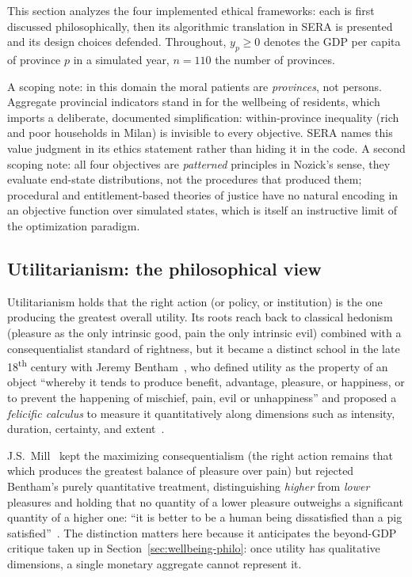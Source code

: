 \documentclass[11pt,a4paper]{article}
\begin{document}
This section analyzes the four implemented ethical frameworks: each is first
discussed philosophically, then its algorithmic translation in SERA is
presented and its design choices defended. Throughout, $y_p \geq 0$ denotes the
GDP per capita of province $p$ in a simulated year, $n = 110$ the number of
provinces.

A scoping note: in this domain the moral patients are \emph{provinces}, not
persons. Aggregate provincial indicators stand in for the wellbeing of
residents, which imports a deliberate, documented simplification:
within-province inequality (rich and poor households in Milan) is invisible to
every objective. SERA names this value judgment in its ethics statement rather
than hiding it in the code. A second scoping note: all four objectives are
\emph{patterned} principles in Nozick's sense, they evaluate end-state
distributions, not the procedures that produced them; procedural and
entitlement-based theories of justice have no natural encoding in an objective
function over simulated states, which is itself an instructive limit of the
optimization paradigm.

\subsection{Utilitarianism: the philosophical view}

Utilitarianism holds that the right action (or policy, or institution) is the
one producing the greatest overall utility. Its roots reach back to classical
hedonism (pleasure as the only intrinsic good, pain the only intrinsic evil)
combined with a consequentialist standard of rightness, but it became a
distinct school in the late 18\textsuperscript{th} century with Jeremy
Bentham~\cite{bentham1789}, who defined utility as the property of an object
``whereby it tends to produce benefit, advantage, pleasure, or happiness, or to
prevent the happening of mischief, pain, evil or unhappiness'' and proposed a
\emph{felicific calculus} to measure it quantitatively along dimensions such as
intensity, duration, certainty, and extent~\cite{mulgan2007}.

J.S.~Mill~\cite{mill1863} kept the maximizing consequentialism (the right
action remains that which produces the greatest balance of pleasure over pain)
but rejected Bentham's purely quantitative treatment, distinguishing
\emph{higher} from \emph{lower} pleasures and holding that no quantity of a
lower pleasure outweighs a significant quantity of a higher one: ``it is better
to be a human being dissatisfied than a pig satisfied''~\cite{crisp1997}. The
distinction matters here because it anticipates the beyond-GDP critique taken
up in Section~\ref{sec:wellbeing-philo}: once utility has qualitative
dimensions, a single monetary aggregate cannot represent it.
\end{document}
